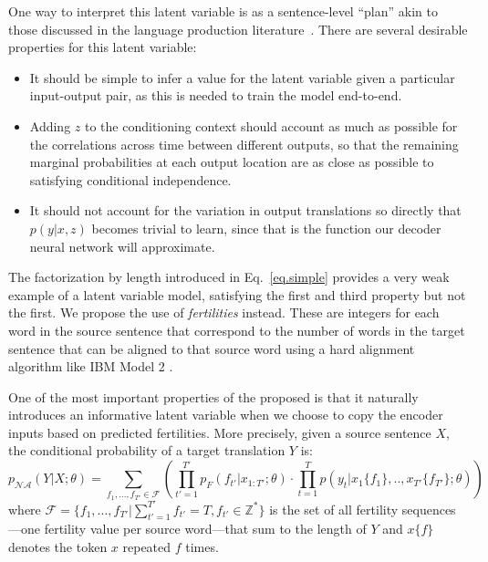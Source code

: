 \documentclass{article} %
\begin{document}
One way to interpret this latent variable is as a sentence-level ``plan'' akin to those discussed in the language production literature~\citep{martin2010planning}. There are several desirable properties for this latent variable:
\begin{itemize}[leftmargin=*]
\item It should be simple to infer a value for the latent variable given a particular input-output pair, as this is needed to train the model end-to-end.
\item Adding $z$ to the conditioning context should account as much as possible for the correlations across time between different outputs, so that the remaining marginal probabilities at each output location are as close as possible to satisfying conditional independence.
\item It should not account for the variation in output translations so directly that $p(y|x, z)$ becomes trivial to learn, since that is the function our decoder neural network will approximate.
\end{itemize}
The factorization by length introduced in Eq.~\ref{eq.simple} provides a very weak example of a latent variable model, satisfying the first and third property but not the first. We propose the use of \emph{fertilities} instead. These are integers for each word in the source sentence that correspond to the number of words in the target sentence that can be aligned to that source word using a hard alignment algorithm like IBM Model 2 \citep{brown1993mathematics}.


One of the most important properties of the proposed \model{} is that it naturally introduces an informative latent variable when we choose to copy the encoder inputs based on predicted fertilities.  More precisely, given a source sentence $X$, the conditional probability of a target translation $Y$ is:
\begin{equation}
p_{\mathcal{NA}}(Y|X; \theta) = \sum_{f_1,...,f_{T'} \in \mathcal{F}}\left(\prod_{t'=1}^{T'}p_F(f_{t'}|x_{1:T'};\theta)\cdot \prod_{t=1}^{T} p(y_t| x_1\{f_1\}, .., x_{T'}\{f_{T'}\};\theta)\right)
\label{eq.latent_fer}
\end{equation}
where $\mathcal{F}=\{f_1,...,f_{T'}| \sum_{t'=1}^{T'}f_{t'}= T, f_{t'} \in \mathbb{Z^*} \}$ is the set of all fertility sequences---one fertility value per source word---that sum to the length of $Y$ and $x\{f\}$ denotes the token $x$ repeated $f$ times.
\end{document}
